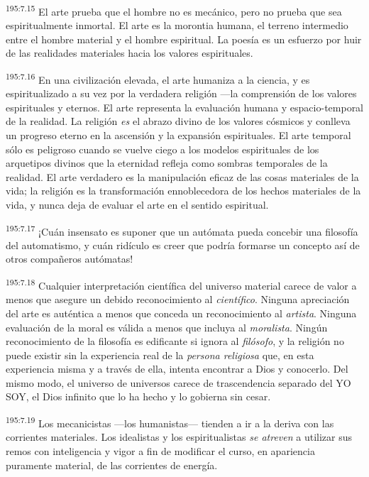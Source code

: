 \par 
\textsuperscript{195:7.15} El arte prueba que el hombre no es mecánico, pero no prueba que sea espiritualmente inmortal. El arte es la morontia humana, el terreno intermedio entre el hombre material y el hombre espiritual. La poesía es un esfuerzo por huir de las realidades materiales hacia los valores espirituales.

\par 
\textsuperscript{195:7.16} En una civilización elevada, el arte humaniza a la ciencia, y es espiritualizado a su vez por la verdadera religión ---la comprensión de los valores espirituales y eternos. El arte representa la evaluación humana y espacio-temporal de la realidad. La religión \textit{es} el abrazo divino de los valores cósmicos y conlleva un progreso eterno en la ascensión y la expansión espirituales. El arte temporal sólo es peligroso cuando se vuelve ciego a los modelos espirituales de los arquetipos divinos que la eternidad refleja como sombras temporales de la realidad. El arte verdadero es la manipulación eficaz de las cosas materiales de la vida; la religión es la transformación ennoblecedora de los hechos materiales de la vida, y nunca deja de evaluar el arte en el sentido espiritual.

\par 
\textsuperscript{195:7.17} ¡Cuán insensato es suponer que un autómata pueda concebir una filosofía del automatismo, y cuán ridículo es creer que podría formarse un concepto así de otros compañeros autómatas!

\par 
\textsuperscript{195:7.18} Cualquier interpretación científica del universo material carece de valor a menos que asegure un debido reconocimiento al \textit{científico}. Ninguna apreciación del arte es auténtica a menos que conceda un reconocimiento al \textit{artista}. Ninguna evaluación de la moral es válida a menos que incluya al \textit{moralista}. Ningún reconocimiento de la filosofía es edificante si ignora al \textit{filósofo}, y la religión no puede existir sin la experiencia real de la \textit{persona religiosa} que, en esta experiencia misma y a través de ella, intenta encontrar a Dios y conocerlo. Del mismo modo, el universo de universos carece de trascendencia separado del YO SOY, el Dios infinito que lo ha hecho y lo gobierna sin cesar.

\par 
\textsuperscript{195:7.19} Los mecanicistas ---los humanistas--- tienden a ir a la deriva con las corrientes materiales. Los idealistas y los espiritualistas \textit{se atreven} a utilizar sus remos con inteligencia y vigor a fin de modificar el curso, en apariencia puramente material, de las corrientes de energía.

